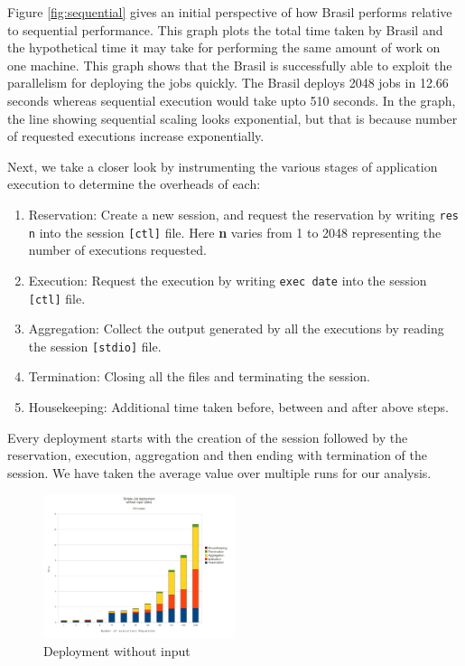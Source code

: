 %
%
Figure \ref{fig:sequential} gives an initial perspective of how Brasil performs
relative to sequential performance.  This graph plots the total time taken by
Brasil and the hypothetical time it may take for performing the same amount of
work on one machine.  This graph shows that the Brasil is successfully able to
exploit the parallelism for deploying the jobs quickly. The Brasil deploys 2048
jobs in 12.66 seconds whereas sequential execution would take upto 510 seconds.
In the graph, the line showing sequential scaling looks exponential, but that is
because number of requested executions increase exponentially.

Next, we take a closer look by instrumenting the various stages of application
execution to determine the overheads of each:

\begin{enumerate}
\item Reservation: Create a new session, and request the reservation by writing
\texttt{res n} into the session \texttt{[ctl]} file.  Here \textbf{n} varies
from 1 to 2048 representing the number of executions requested. 

\item Execution: Request the execution by writing \texttt{exec date} into the
session \texttt{[ctl]} file.

\item Aggregation: Collect the output generated by all the executions by reading
the session \texttt{[stdio]} file.

\item Termination: Closing all the files and terminating the session.

\item Housekeeping: Additional time taken before, between and after above steps.
\end{enumerate}
Every deployment starts with the creation of the session followed by the
reservation, execution, aggregation and then ending with termination of the
session.  We have taken the average value over multiple runs for our analysis.

\begin{figure}[h]
  \begin{center}
    \leavevmode
      \includegraphics[height=0.2\textheight,width=0.5\textwidth]
		{./img/date_graph}
    \caption{Deployment without input}
    \label{fig:date_graph}
  \end{center}
\end{figure}


